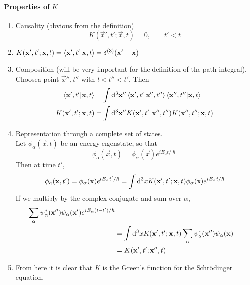 \documentclass[a4paper]{article}
\begin{document}
\paragraph{Properties of $K$}
\begin{enumerate}
	\item Causality (obvious from the definition)
		\[
			K(\vec{x}',t';\vec{x},t) = 0, \qquad t'< t
		\]
	\item $K(\boldsymbol{\mathbf{x}}',t';\boldsymbol{\mathbf{x}},t) = \left\langle \boldsymbol{\mathbf{x}}',t'\middle\vert \boldsymbol{\mathbf{x}},t \right\rangle =
		\delta^{(3)}(\boldsymbol{\mathbf{x}}'-\boldsymbol{\mathbf{x}})$
	\item Composition (will be very important for the definition of the
		path integral). Choosea point $\vec{x}'',t''$ with $t<t''<t'$.
		Then
		\begin{align*}
			\left\langle \boldsymbol{\mathbf{x}}',t'\middle\vert \boldsymbol{\mathbf{x}},t \right\rangle &=
				\int\mathrm{d}^3\boldsymbol{\mathbf{x}}''
				\left\langle \boldsymbol{\mathbf{x}}',t'\middle\vert \boldsymbol{\mathbf{x}}'',t'' \right\rangle
				\left\langle \boldsymbol{\mathbf{x}}'',t''\middle\vert \boldsymbol{\mathbf{x}},t \right\rangle\\
			K(\boldsymbol{\mathbf{x}}',t';\boldsymbol{\mathbf{x}},t) &= 
				\int\mathrm{d}^3\boldsymbol{\mathbf{x}}''
				K(\boldsymbol{\mathbf{x}}',t';\boldsymbol{\mathbf{x}}'',t'')
				K(\boldsymbol{\mathbf{x}}'',t'';\boldsymbol{\mathbf{x}},t)
		\end{align*}
	\item Representation through a complete set of states.\\
		Let $\phi_\alpha(\vec{x},t)$ be an energy eigenstate, so that
		\[
			\phi_\alpha(\vec{x},t) =
			\phi_\alpha(\vec{x})e^{iE_\alpha t/\hslash}
		\]
		Then at time $t'$,
		\[
			\phi_\alpha(\boldsymbol{\mathbf{x}},t') =
			\phi_\alpha(\boldsymbol{\mathbf{x}})e^{iE_\alpha t'/\hslash} =
			\int\mathrm{d}^3 x K(\boldsymbol{\mathbf{x}}',t';\boldsymbol{\mathbf{x}},t) 
			\phi_\alpha(\boldsymbol{\mathbf{x}})e^{iE_\alpha t/\hslash}
		\]
		If we multiply by the complex conjugate and sum over $\alpha$,
		\begin{align*}
			\sum_\alpha
			\psi_\alpha^\ast(\boldsymbol{\mathbf{x}}'')\psi_\alpha(\boldsymbol{\mathbf{x}}')
			e^{iE_\alpha(t-t')/\hslash}\\
			&= \int\mathrm{d}^3 x K(\boldsymbol{\mathbf{x}}',t';\boldsymbol{\mathbf{x}},t)
			\sum_\alpha \psi_\alpha^\ast(\boldsymbol{\mathbf{x}}'')
			\psi_\alpha(\boldsymbol{\mathbf{x}})\\
			&= K(\boldsymbol{\mathbf{x}}',t';\boldsymbol{\mathbf{x}}'',t)
		\end{align*}
	\item From here it is clear that $K$ is the Green's function for the
		Schr\"odinger equation.
\end{enumerate}
\end{document}

